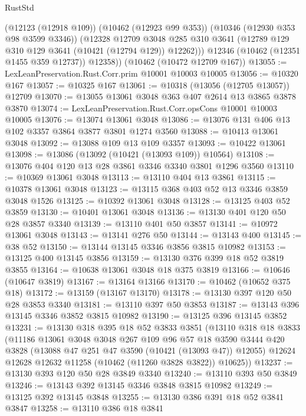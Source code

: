 \begin{lexlean}{RustStd}
\begin{coremodule}
          (@12123 (@12918 @109))
          (@10462 (@12923 @99 @353))
          (@10346 (@12930 @353 @98 @3599 @3346))
          (@12328
            @12709
            @3048
            @285
            @310
            @3641
            (@12789 @129 @310 @129 @3641 (@10421 (@12794 @129)) @12262)))
        @12346
        (@10462 (@12351 @1455 @359 @12737))
        @12358))
    (@10462 (@10472 @12709 @167))
@13055 := LexLeanPreservation.Rust.Corr.prim @10001 @10003 @10005
@13056 := @10320 @167
@13057 := @10325 @167
@13061 := @10318 (@13056 (@12705 @13057)) @12709
@13070 := @13055 @13061 @3048 @363 @407 @2614 @13 @3865 @3878 @3870
@13074 := LexLeanPreservation.Rust.Corr.opsCons @10001 @10003 @10005
@13076 := @13074 @13061 @3048
@13086 := @13076 @131 @406 @13 @102 @3357 @3864 @3877 @3801 @1274 @3560
@13088 := @10413 @13061 @3048
@13092 := @13088 @109 @13 @109 @3357
@13093 := @10422 @13061
@13098 := @13086 (@13092 (@10421 (@13093 @109)) @10564)
@13108 := @13076 @404 @120 @13 @28 @3861 @3346 @3340 @3801 @1296 @3560
@13110 := @10369 @13061 @3048
@13113 := @13110 @404 @13 @3861
@13115 := @10378 @13061 @3048
@13123 := @13115 @368 @403 @52 @13 @3346 @3859 @3048 @1526
@13125 := @10392 @13061 @3048
@13128 := @13125 @403 @52 @3859
@13130 := @10401 @13061 @3048
@13136 := @13130 @401 @120 @50 @28 @3857 @3340
@13139 := @13110 @401 @50 @3857
@13141 := @10972 @13061 @3048
@13143 := @13141 @276 @50
@13144 := @13143 @400
@13145 := @38 @52
@13150 := @13144 @13145 @3346 @3856 @3815 @10982
@13153 := @13125 @400 @13145 @3856
@13159 := @13130 @376 @399 @18 @52 @3819 @3855
@13164 := @10638 @13061 @3048 @18 @375 @3819
@13166 := @10646 (@10647 @3819)
@13167 := @13164 @13166
@13170 := @10462 (@10652 @375 @18)
@13172 := @13159 (@13167 @13170)
@13178 := @13130 @397 @120 @50 @28 @3853 @3340
@13181 := @13110 @397 @50 @3853
@13187 := @13143 @396 @13145 @3346 @3852 @3815 @10982
@13190 := @13125 @396 @13145 @3852
@13231 := @13130
    @318
    @395
    @18
    @52
    @3833
    @3851
    (@13110
      @318
      @18
      @3833
      (@11186
        @13061
        @3048
        @3048
        @267
        @109
        @96
        @57
        @18
        @3590
        @3444
        @420
        @3828
        (@13088 @47 @251 @47 @3590 (@10421 (@13093 @47)) @12055)
        @12624
        @12628
        @12632
        @11258
        (@10462 (@11260 @3828 @3822))
        @10625))
@13237 := @13130 @393 @120 @50 @28 @3849 @3340
@13240 := @13110 @393 @50 @3849
@13246 := @13143 @392 @13145 @3346 @3848 @3815 @10982
@13249 := @13125 @392 @13145 @3848
@13255 := @13130 @386 @391 @18 @52 @3841 @3847
@13258 := @13110 @386 @18 @3841

\end{coremodule}
\end{lexlean}
